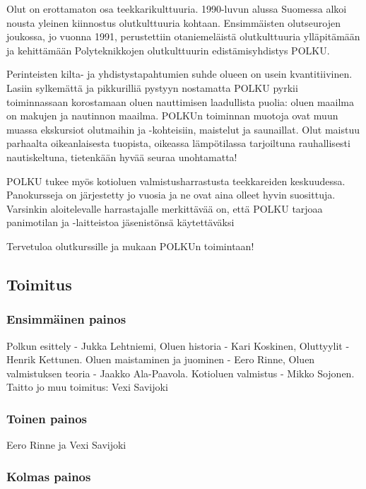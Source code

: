 \documentclass[a4paper,11pt]{report}
\begin{document}
Olut on erottamaton osa teekkarikulttuuria. 1990-luvun alussa Suomessa alkoi nousta yleinen kiinnostus olutkulttuuria kohtaan. Ensimmäisten olutseurojen joukossa, jo vuonna 1991, perustettiin otaniemeläistä olutkulttuuria ylläpitämään ja kehittämään Polyteknikkojen olutkulttuurin edistämisyhdistys POLKU. 

Perinteisten kilta- ja yhdistystapahtumien suhde olueen on usein kvantitiivinen. Lasiin sylkemättä ja pikkurilliä pystyyn nostamatta POLKU pyrkii toiminnassaan korostamaan oluen nauttimisen laadullista puolia: oluen maailma on makujen ja nautinnon maailma. POLKUn toiminnan muotoja ovat muun muassa ekskursiot olutmaihin ja -kohteisiin, maistelut ja saunaillat. Olut maistuu parhaalta oikeanlaisesta tuopista, oikeassa lämpötilassa tarjoiltuna rauhallisesti nautiskeltuna, tietenkään hyvää seuraa unohtamatta!

POLKU tukee myös kotioluen valmistusharrastusta teekkareiden keskuudessa. Panokursseja on järjestetty jo vuosia ja ne ovat aina olleet hyvin suosittuja. Varsinkin aloitelevalle harrastajalle merkittävää on, että POLKU tarjoaa panimotilan ja -laitteistoa jäsenistönsä käytettäväksi

Tervetuloa olutkurssille ja mukaan POLKUn toimintaan!

\subsection*{Toimitus}

\subsubsection*{Ensimmäinen painos}

Polkun esittely - Jukka Lehtniemi, Oluen historia - Kari Koskinen, Oluttyylit - Henrik Kettunen. Oluen maistaminen ja juominen - Eero Rinne, Oluen valmistuksen teoria - Jaakko Ala-Paavola. Kotioluen valmistus - Mikko Sojonen. Taitto jo muu toimitus: Vexi Savijoki

\subsubsection*{Toinen painos}

Eero Rinne ja Vexi Savijoki

\subsubsection*{Kolmas painos}
\end{document}

